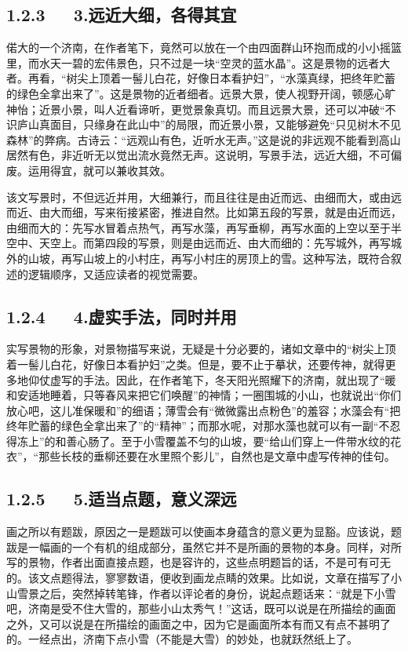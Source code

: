 \documentclass[letterpaper,12pt,english]{sphinxmanual}
\begin{document}
\subsection{1.2.3   3.远近大细，各得其宜}
\label{\detokenize{p01_u6563_u6587/_u8001_u820d-_u6d4e_u5357_u7684_u51ac_u5929:id7}}
偌大的一个济南，在作者笔下，竟然可以放在一个由四面群山环抱而成的小小摇篮里，而水天一碧的宏伟景色，只不过是一块“空灵的蓝水晶”。这是景物的远者大者。再看，“树尖上顶着一髻儿白花，好像日本看护妇”，“水藻真绿，把终年贮蓄的绿色全拿出来了”。这是景物的近者细者。远景大景，使人视野开阔，顿感心旷神怡；近景小景，叫人近看谛听，更觉景象真切。而且远景大景，还可以冲破“不识庐山真面目，只缘身在此山中”的局限，而近景小景，又能够避免“只见树木不见森林”的弊病。古诗云：“远观山有色，近听水无声。”这是说的非远观不能看到高山居然有色，非近听无以觉出流水竟然无声。这说明，写景手法，远近大细，不可偏废。运用得宜，就可以兼收其效。

该文写景时，不但远近并用，大细兼行，而且往往是由近而远、由细而大，或由远而近、由大而细，写来衔接紧密，推进自然。比如第五段的写景，就是由近而远，由细而大的：先写水冒着点热气，再写水藻，再写垂柳，再写水面的上空以至于半空中、天空上。而第四段的写景，则是由远而近、由大而细的：先写城外，再写城外的山坡，再写山坡上的小村庄，再写小村庄的房顶上的雪。这种写法，既符合叙述的逻辑顺序，又适应读者的视觉需要。


\subsection{1.2.4   4.虚实手法，同时并用}
\label{\detokenize{p01_u6563_u6587/_u8001_u820d-_u6d4e_u5357_u7684_u51ac_u5929:id8}}
实写景物的形象，对景物描写来说，无疑是十分必要的，诸如文章中的“树尖上顶着一髻儿白花，好像日本看护妇”之类。但是，要不止于摹状，还要传神，就得更多地仰仗虚写的手法。因此，在作者笔下，冬天阳光照耀下的济南，就出现了“暖和安适地睡着，只等春风来把它们唤醒”的神情；一圈围城的小山，也就说出“你们放心吧，这儿准保暖和”的细语；薄雪会有“微微露出点粉色”的羞容；水藻会有“把终年贮蓄的绿色全拿出来了”的“精神”；而那水呢，对那水藻也就可以有一副“不忍得冻上”的和善心肠了。至于小雪覆盖不匀的山坡，要“给山们穿上一件带水纹的花衣”，“那些长枝的垂柳还要在水里照个影儿”，自然也是文章中虚写传神的佳句。


\subsection{1.2.5   5.适当点题，意义深远}
\label{\detokenize{p01_u6563_u6587/_u8001_u820d-_u6d4e_u5357_u7684_u51ac_u5929:id9}}
画之所以有题跋，原因之一是题跋可以使画本身蕴含的意义更为显豁。应该说，题跋是一幅画的一个有机的组成部分，虽然它并不是所画的景物的本身。同样，对所写的景物，作者出面直接点题，也是容许的，这些点明题旨的话，不是可有可无的。该文点题得法，寥寥数语，便收到画龙点睛的效果。比如说，文章在描写了小山雪景之后，突然掉转笔锋，作者以评论者的身份，说起点题话来：“就是下小雪吧，济南是受不住大雪的，那些小山太秀气！”这话，既可以说是在所描绘的画面之外，又可以说是在所描绘的画面之中，因为它是画面所本有而又有点不甚明了的。一经点出，济南下点小雪（不能是大雪）的妙处，也就跃然纸上了。
\end{document}
